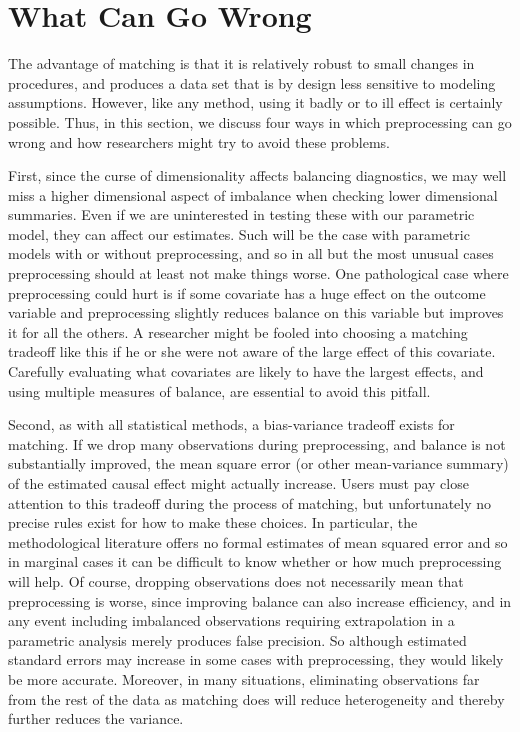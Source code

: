 \documentclass[11pt,titlepage]{article}
\begin{document}
\section{What Can Go Wrong}

The advantage of matching is that it is relatively robust to small
changes in procedures, and produces a data set that is by design less
sensitive to modeling assumptions.  However, like any method, using it
badly or to ill effect is certainly possible.  Thus, in this section,
we discuss four ways in which preprocessing can go wrong and how
researchers might try to avoid these problems.

First, since the curse of dimensionality affects balancing
diagnostics, we may well miss a higher dimensional aspect of imbalance
when checking lower dimensional summaries.  Even if we are
uninterested in testing these with our parametric model, they can
affect our estimates.  Such will be the case with parametric models
with or without preprocessing, and so in all but the most unusual
cases preprocessing should at least not make things worse.  One
pathological case where preprocessing could hurt is if some covariate
has a huge effect on the outcome variable and preprocessing slightly
reduces balance on this variable but improves it for all the others.
A researcher might be fooled into choosing a matching tradeoff like
this if he or she were not aware of the large effect of this
covariate.  Carefully evaluating what covariates are likely to have
the largest effects, and using multiple measures of balance, are
essential to avoid this pitfall.

Second, as with all statistical methods, a bias-variance tradeoff
exists for matching.  If we drop many observations during
preprocessing, and balance is not substantially improved, the mean
square error (or other mean-variance summary) of the estimated causal
effect might actually increase.  Users must pay close attention to
this tradeoff during the process of matching, but unfortunately no
precise rules exist for how to make these choices.  In particular, the
methodological literature offers no formal estimates of mean squared
error and so in marginal cases it can be difficult to know whether or
how much preprocessing will help.  Of course, dropping observations
does not necessarily mean that preprocessing is worse, since improving
balance can also increase efficiency, and in any event including
imbalanced observations requiring extrapolation in a parametric
analysis merely produces false precision.  So although estimated
standard errors may increase in some cases with preprocessing, they
would likely be more accurate.  Moreover, in many situations,
eliminating observations far from the rest of the data as matching
does will reduce heterogeneity and thereby further reduces the
variance.
\end{document}
